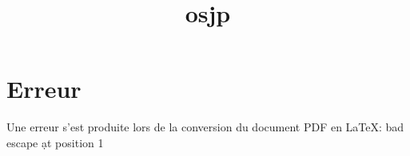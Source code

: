 \documentclass[12pt]{article}
\title{osjp}
\author{}
\date{}
\begin{document}
\maketitle
\tableofcontents
\newpage

\section{Erreur}
Une erreur s'est produite lors de la conversion du document PDF en LaTeX: bad escape \d at position 1
\end{document}
